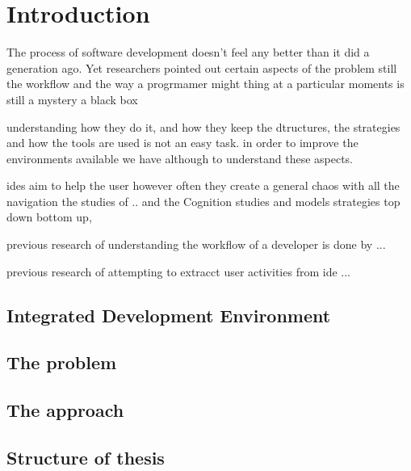 \chapter{Introduction}

The process of software development doesn't feel any better than it did a generation ago. Yet researchers pointed out certain aspects of the problem still the workflow and the way a progrmamer might thing at a particular moments is still a mystery a black box 

understanding how they do it, and how they keep the dtructures, the strategies and how the tools are used is not an easy task. in order to improve the environments available we have although to understand these aspects.

ides aim to help the user however often they create a general chaos with all the navigation the studies of .. and the Cognition studies and models strategies top down bottom up, 

previous research of understanding the workflow of a developer is done by ... 

previous research of attempting to extracct user activities from \gls{ide} ... 


\section{Integrated Development Environment}
\section{The problem}
\section{The approach}
\section{Structure of thesis}
